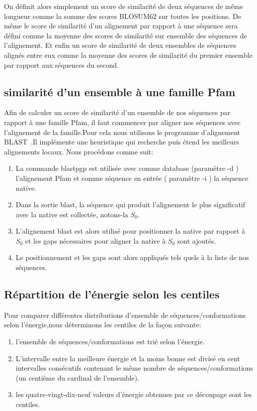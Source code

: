 On définit alors simplement un score de similarité de deux séquences de même longueur comme la somme des scores BLOSUM62 sur toutes les positions. De même le score de similarité d'un alignement par rapport à une séquence sera défini comme la moyenne des scores de similarité sur ensemble des séquences de l'alignement. Et enfin un score de similarité de deux ensembles de séquences alignés entre eux comme la moyenne des scores de similarité du premier ensemble par rapport aux séquences du second.  

\subsection{similarité d'un ensemble à une famille Pfam}

Afin de calculer un score de similarité d'un ensemble de nos séquences par rapport à une famille Pfam, il faut commencer par aligner nos séquences avec l'alignement de la famille.Pour cela nous utilisons le programme d'alignement BLAST~\citep{refBLAST}.Il implémente une heuristique qui recherche puis étend les meilleurs alignements locaux. Nous procédons comme suit:
\begin{enumerate}
\item La commande blastpgp est utilisée avec comme database (paramètre -d ) l'alignement Pfam et comme séquence en entrée ( paramètre -i ) la séquence native. 
\item Dans la sortie blast, la séquence qui produit l'alignement le plus significatif avec la native est collectée, notons-la $S_0$. 
\item L'alignement blast est alors utilisé pour positionner la native par rapport à $S_0$ et les gaps nécessaires pour aligner la native à $S_0$ sont ajoutés.
\item  Le positionnement et les gaps sont alors appliqués tels quels à la liste de nos séquences.

\end{enumerate}


\subsection{Répartition de l'énergie selon les centiles }

Pour comparer différentes distributions d'ensemble de séquences/conformations selon l'énergie,nous déterminons les centiles de la façon suivante: 

\begin{enumerate}
\item l'ensemble de séquences/conformations est trié selon l'énergie.
\item L'intervalle entre la meilleure énergie et la moins bonne est divisé en cent intervalles consécutifs contenant le même nombre de séquences/conformations (un centième du cardinal de l'ensemble).
\item les quatre-vingt-dix-neuf valeurs d'énergie obtenues par ce découpage sont les centiles.   
\end{enumerate}


